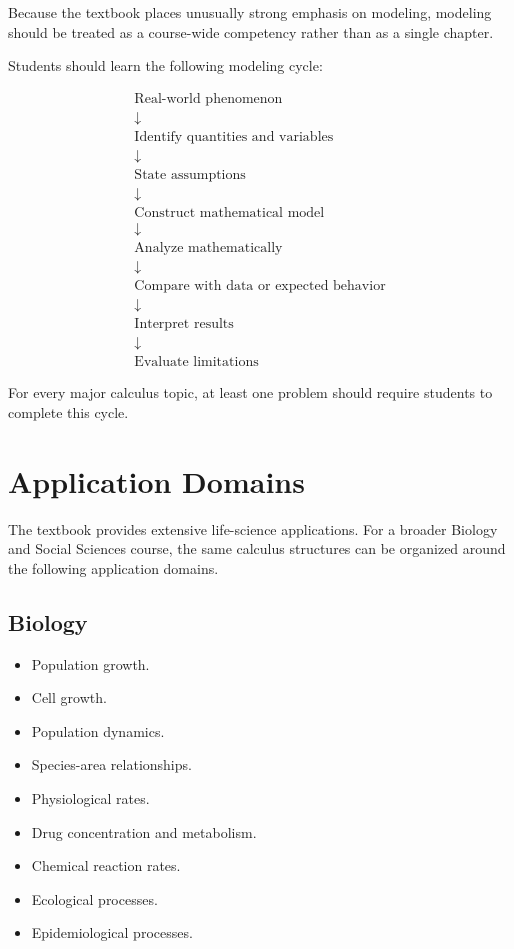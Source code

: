 \documentclass[11pt]{article}
\begin{document}
Because the textbook places unusually strong emphasis on modeling, modeling
should be treated as a course-wide competency rather than as a single
chapter.

Students should learn the following modeling cycle:

\[
\boxed{
\begin{array}{c}
\text{Real-world phenomenon}\\
\downarrow\\
\text{Identify quantities and variables}\\
\downarrow\\
\text{State assumptions}\\
\downarrow\\
\text{Construct mathematical model}\\
\downarrow\\
\text{Analyze mathematically}\\
\downarrow\\
\text{Compare with data or expected behavior}\\
\downarrow\\
\text{Interpret results}\\
\downarrow\\
\text{Evaluate limitations}
\end{array}
}
\]

For every major calculus topic, at least one problem should require students
to complete this cycle.

\section{Application Domains}

The textbook provides extensive life-science applications. For a broader
Biology and Social Sciences course, the same calculus structures can be
organized around the following application domains.

\subsection{Biology}

\begin{itemize}
    \item Population growth.
    \item Cell growth.
    \item Population dynamics.
    \item Species-area relationships.
    \item Physiological rates.
    \item Drug concentration and metabolism.
    \item Chemical reaction rates.
    \item Ecological processes.
    \item Epidemiological processes.
\end{itemize}
\end{document}
